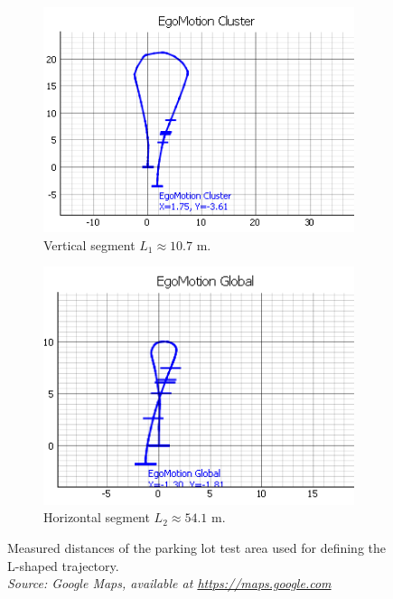 \begin{figure}[!htbp]
    \centering
    \begin{subfigure}{0.48\linewidth}
        \centering
        \includegraphics[width=\linewidth]{images/labDriveAroundICP_Cluster1.png}
        \caption{Vertical segment $L_1 \approx 10.7$ m.}
        \label{fig:labDriveAroundClustered}
    \end{subfigure}
    \hfill
    \begin{subfigure}{0.48\linewidth}
        \centering
        \includegraphics[width=\linewidth]{images/labDriveAroundICP_Full1.png}
        \caption{Horizontal segment $L_2 \approx 54.1$ m.}
        \label{fig:labDriveAroundFull}
    \end{subfigure}
    \caption{Measured distances of the parking lot test area used for defining the L-shaped trajectory.\\
    \textit{Source: Google Maps, available at \url{https://maps.google.com} \cite{googlemaps_fhdo}}}
    \label{fig:labDriveAround}
\end{figure}


